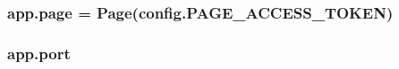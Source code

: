 \subsubsection[{page}]{\setlength{\rightskip}{0pt plus 5cm}app.\+page = Page({\bf config.\+P\+A\+G\+E\+\_\+\+A\+C\+C\+E\+S\+S\+\_\+\+T\+O\+K\+EN})}\label{namespaceapp_a0aa9707053e0082ace1eb37e3c5c5359}
\subsubsection[{port}]{\setlength{\rightskip}{0pt plus 5cm}app.\+port}\label{namespaceapp_ae996542be63ac459a38531f7c2dd0a49}
